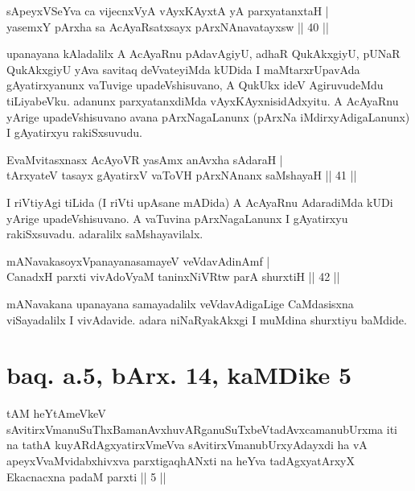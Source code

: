 \begin{shl}
sA\s peyxVSeYva ca vijecnxVyA vAyxKAyxtA yA parxyatanxtaH | \\
yasemxY pArxha sa AcAyaRsatxsayx pArxNAnavatayxsw \hfill ||  40 || 
\end{shl}

\begin{artha} 
upanayana kAladalilx A AcAyaRnu pAdavAgiyU, adhaR QukAkxgiyU, pUNaR 
QukAkxgiyU yAva savitaq deVvateyiMda kUDida I maMtarxrUpavAda 
gAyatirxyanunx vaTuvige upadeVshisuvano, A QukUkx ideV AgiruvudeMdu 
tiLiyabeVku. adanunx parxyatanxdiMda vAyxKAyxnisidAdxyitu. A AcAyaRnu 
yArige upadeVshisuvano avana pArxNagaLanunx (pArxNa 
iMdirxyAdigaLanunx) I gAyatirxyu rakiSxsuvudu.
\end{artha}


\begin{shl}
EvaMvitasxnasx AcAyoVR yasAmx anAvxha sAdaraH | \\
tArxyateV tasayx gAyatirxV vaToVH pArxNAnanx saMshayaH \hfill ||  41 || 
\end{shl}

\begin{artha} 
I riVtiyAgi tiLida (I riVti upAsane mADida) A AcAyaRnu AdaradiMda kUDi 
yArige upadeVshisuvano. A vaTuvina pArxNagaLanunx I gAyatirxyu 
rakiSxsuvadu. adaralilx saMshayavilalx.
\end{artha}


\begin{shl}
mANavakasoyxVpanayanasamayeV veVdavAdinAmf | \\
CanadxH parxti vivAdoV\s yaM taninxNiVRtw parA shurxtiH \hfill ||  42 || 
\end{shl}

\begin{artha} 
mANavakana upanayana samayadalilx veVdavAdigaLige CaMdasisxna 
viSayadalilx I vivAdavide. adara niNaRyakAkxgi I muMdina shurxtiyu 
baMdide.
\end{artha}

\section*{baq. a.5, bArx. 14, kaMDike 5}

\begin{shl}
tAM heYtAmeVkeV sAvitirxVmanuSuThxBamanAvxhuvARganuSuTxbeVtadAvxcamanubUrxma iti na tathA kuyARdAgxyatirxVmeVva sAvitirxVmanubUrxyAdayxdi ha vA apeyxVvaMvidabxhivxva parxtigaqhANxti na heYva tadAgxyatArxyX Ekacnacxna padaM parxti || 5 ||
\end{shl}

